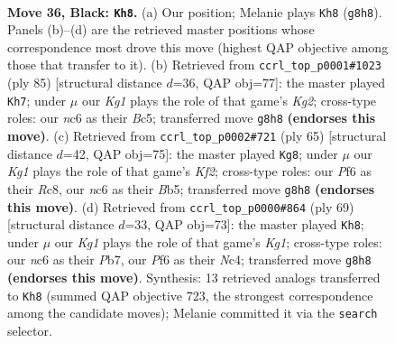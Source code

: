 \documentclass[11pt]{article}
\begin{document}
\clearpage

\begin{figure}[p]\centering
\begin{subfigure}{0.46\textwidth}\centering
\resizebox{\linewidth}{!}{%
\newchessgame
\chessboard[
  setfen={6k1/6Rp/2N2ppB/8/5P1P/3P4/PrP2PK1/8 b - - 1 36},
  showmover=false,
  pgfstyle=straightmove, color=movearrow, markmove={g8-h8}
]}
\caption{}
\end{subfigure}\hfill
\begin{subfigure}{0.46\textwidth}\centering
\resizebox{\linewidth}{!}{%
\newchessgame
\chessboard[
  setfen={4B3/6k1/1p4Rp/p1b3p1/2P5/1P3KPP/P2r4/8 b - - 2 43},
  showmover=false,
  pgfstyle=straightmove, color=movearrow, markmove={g7-h7}
]}
\caption{}
\end{subfigure}
\\[4pt]
\begin{subfigure}{0.46\textwidth}\centering
\resizebox{\linewidth}{!}{%
\newchessgame
\chessboard[
  setfen={2r5/5k1p/5Rp1/pb2B1p1/8/P4P1P/6P1/6K1 b - - 4 33},
  showmover=false,
  pgfstyle=straightmove, color=movearrow, markmove={f7-g8}
]}
\caption{}
\end{subfigure}\hfill
\begin{subfigure}{0.46\textwidth}\centering
\resizebox{\linewidth}{!}{%
\newchessgame
\chessboard[
  setfen={4r1k1/pp4Rp/4P1pB/8/2n3p1/2P5/5PKP/8 b - - 3 35},
  showmover=false,
  pgfstyle=straightmove, color=movearrow, markmove={g8-h8}
]}
\caption{}
\end{subfigure}
\caption{\textbf{Move 36, Black: \texttt{Kh8}.} (a) Our position; Melanie plays \texttt{Kh8} (\texttt{g8h8}). Panels (b)--(d) are the retrieved master positions whose correspondence most drove this move (highest QAP objective among those that transfer to it). (b) Retrieved from \texttt{ccrl\_top\_p0001\#1023} (ply 85) [structural distance $d$=36, QAP obj=77]: the master played \texttt{Kh7}; under $\mu$ our \emph{Kg1} plays the role of that game's \emph{Kg2}; cross-type roles: our \emph{n}c6 as their \emph{B}c5; transferred move \texttt{g8h8} \textbf{(endorses this move)}. (c) Retrieved from \texttt{ccrl\_top\_p0002\#721} (ply 65) [structural distance $d$=42, QAP obj=75]: the master played \texttt{Kg8}; under $\mu$ our \emph{Kg1} plays the role of that game's \emph{Kf2}; cross-type roles: our \emph{P}f6 as their \emph{R}c8, our \emph{n}c6 as their \emph{B}b5; transferred move \texttt{g8h8} \textbf{(endorses this move)}. (d) Retrieved from \texttt{ccrl\_top\_p0000\#864} (ply 69) [structural distance $d$=33, QAP obj=73]: the master played \texttt{Kh8}; under $\mu$ our \emph{Kg1} plays the role of that game's \emph{Kg1}; cross-type roles: our \emph{n}c6 as their \emph{P}b7, our \emph{P}f6 as their \emph{N}c4; transferred move \texttt{g8h8} \textbf{(endorses this move)}. Synthesis: 13 retrieved analogs transferred to \texttt{Kh8} (summed QAP objective 723, the strongest correspondence among the candidate moves); Melanie committed it via the \texttt{search} selector.}
\label{fig:thought-m71}
\end{figure}
\end{document}
